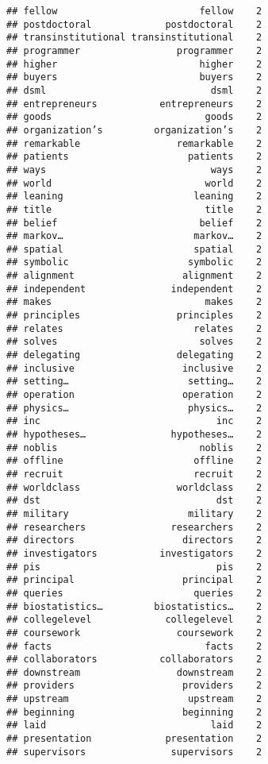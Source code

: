 \documentclass[]{article}
\begin{document}
\begin{verbatim}
## fellow                         fellow    2
## postdoctoral             postdoctoral    2
## transinstitutional transinstitutional    2
## programmer                 programmer    2
## higher                         higher    2
## buyers                         buyers    2
## dsml                             dsml    2
## entrepreneurs           entrepreneurs    2
## goods                           goods    2
## organization’s         organization’s    2
## remarkable                 remarkable    2
## patients                     patients    2
## ways                             ways    2
## world                           world    2
## leaning                       leaning    2
## title                           title    2
## belief                         belief    2
## markov…                       markov…    2
## spatial                       spatial    2
## symbolic                     symbolic    2
## alignment                   alignment    2
## independent               independent    2
## makes                           makes    2
## principles                 principles    2
## relates                       relates    2
## solves                         solves    2
## delegating                 delegating    2
## inclusive                   inclusive    2
## setting…                     setting…    2
## operation                   operation    2
## physics…                     physics…    2
## inc                               inc    2
## hypotheses…               hypotheses…    2
## noblis                         noblis    2
## offline                       offline    2
## recruit                       recruit    2
## worldclass                 worldclass    2
## dst                               dst    2
## military                     military    2
## researchers               researchers    2
## directors                   directors    2
## investigators           investigators    2
## pis                               pis    2
## principal                   principal    2
## queries                       queries    2
## biostatistics…         biostatistics…    2
## collegelevel             collegelevel    2
## coursework                 coursework    2
## facts                           facts    2
## collaborators           collaborators    2
## downstream                 downstream    2
## providers                   providers    2
## upstream                     upstream    2
## beginning                   beginning    2
## laid                             laid    2
## presentation             presentation    2
## supervisors               supervisors    2

\end{verbatim}
\end{document}
